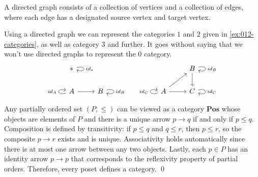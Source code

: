 \begin{definition}
  A directed graph consists of a collection of vertices and a collection of edges, where each edge has a designated source vertex and target vertex.
\end{definition}
\begin{example} Using a directed graph we can represent the categories $1$ and $2$ given in \ref{ex:012-categories}, as well as category $3$ and further. It goes without saying that we won't use directed graphs to represent the $0$ category.
  \[
    \begin{tikzcd}
      * \arrow[loop right, "id_*"] & & & & & B \arrow[d] \arrow[loop right, "id_B"] \\
      A \arrow[r] \arrow[loop left, "id_A"] & B \arrow[loop right, "id_B"] & & &A \arrow[r] \arrow[ru] \arrow[loop left, "id_C"] & C \arrow[loop right, "id_C"]
    \end{tikzcd}
  \]
\end{example}

\begin{proposition} Any partially ordered set $(P, \leq)$ can be viewed as a category $\mathbf{Pos}$ whose objects are elements of $P$ and there is a unique arrow $p \to q$ 
  if and only if $p \leq q$.  
  Composition is defined by transitivity: if $p \leq q$ and $q \leq r$, then $p \leq r$, 
  so the composite $p \to r$ exists and is unique.  
  Associativity holds automatically since there is at most one arrow between any two objects.  
  Lastly, each $p \in P$ has an identity arrow $p \to p$ that corresponds to the reflexivity property of partial orders.
  Therefore, every poset defines a category. \qed
\end{proposition}

